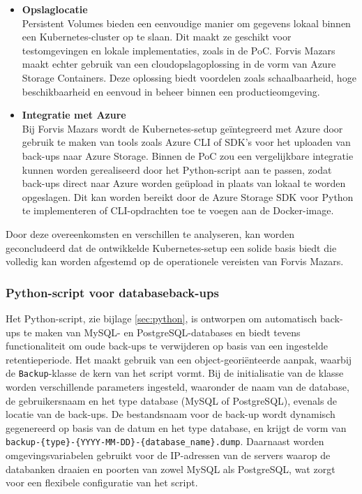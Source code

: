 \begin{itemize}
    \item \textbf{Opslaglocatie} \\
    Persistent Volumes bieden een eenvoudige manier om gegevens lokaal binnen een Kubernetes-cluster op te slaan. Dit maakt ze geschikt voor testomgevingen en lokale implementaties, zoals in de PoC. Forvis Mazars maakt echter gebruik van een cloudopslagoplossing in de vorm van Azure Storage Containers. Deze oplossing biedt voordelen zoals schaalbaarheid, hoge beschikbaarheid en eenvoud in beheer binnen een productieomgeving.
    
    \item \textbf{Integratie met Azure} \\
    Bij Forvis Mazars wordt de Kubernetes-setup geïntegreerd met Azure door gebruik te maken van tools zoals Azure CLI of SDK’s voor het uploaden van back-ups naar Azure Storage. Binnen de PoC zou een vergelijkbare integratie kunnen worden gerealiseerd door het Python-script aan te passen, zodat back-ups direct naar Azure worden geüpload in plaats van lokaal te worden opgeslagen. Dit kan worden bereikt door de Azure Storage SDK voor Python te implementeren of CLI-opdrachten toe te voegen aan de Docker-image.
\end{itemize}

Door deze overeenkomsten en verschillen te analyseren, kan worden geconcludeerd dat de ontwikkelde Kubernetes-setup een solide basis biedt die volledig kan worden afgestemd op de operationele vereisten van Forvis Mazars.

\subsubsection{Python-script voor databaseback-ups}
Het Python-script, zie bijlage \ref{sec:python}, is ontworpen om automatisch back-ups te maken van MySQL- en PostgreSQL-databases en biedt tevens functionaliteit om oude back-ups te verwijderen op basis van een ingestelde retentieperiode. Het maakt gebruik van een object-georiënteerde aanpak, waarbij de \texttt{Backup}-klasse de kern van het script vormt. Bij de initialisatie van de klasse worden verschillende parameters ingesteld, waaronder de naam van de database, de gebruikersnaam en het type database (MySQL of PostgreSQL), evenals de locatie van de back-ups. De bestandsnaam voor de back-up wordt dynamisch gegenereerd op basis van de datum en het type database, en krijgt de vorm van \texttt{backup-\{type\}-\{YYYY-MM-DD\}-\{database\_name\}.dump}. Daarnaast worden omgevingsvariabelen gebruikt voor de IP-adressen van de servers waarop de databanken draaien en poorten van zowel MySQL als PostgreSQL, wat zorgt voor een flexibele configuratie van het script.

